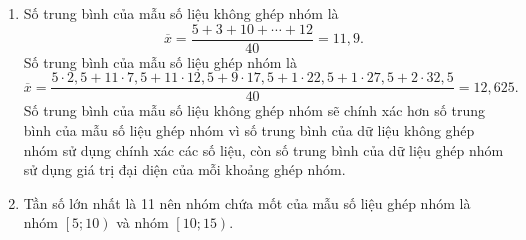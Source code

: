 \begin{bt}
{\begin{enumerate}
	\item [b)] Số trung bình của mẫu số liệu không ghép nhóm là
	$$\overline{x}=\dfrac{5+3+10+\cdots +12}{40}=11{,}9.$$
	Số trung bình của mẫu số liệu ghép nhóm là
	$$\overline{x}=\dfrac{5\cdot 2{,}5+11\cdot 7{,}5+11\cdot 12{,}5+9\cdot 17{,}5+1\cdot 22{,}5+1\cdot 27{,}5+2\cdot 32{,}5}{40}=12{,}625.$$
	Số trung bình của mẫu số liệu không ghép nhóm sẽ chính xác hơn số trung bình của mẫu số liệu ghép nhóm vì số trung bình của dữ liệu không ghép nhóm sử dụng chính xác các số liệu, còn số trung bình của dữ liệu ghép nhóm sử dụng giá trị đại diện của mỗi khoảng ghép nhóm.
	\item [c)] Tần số lớn nhất là 11 nên nhóm chứa mốt của mẫu số liệu ghép nhóm là nhóm $\left[5;10\right)$ và nhóm $\left[10;15\right)$.
\end{enumerate}
	}
\end{bt}

